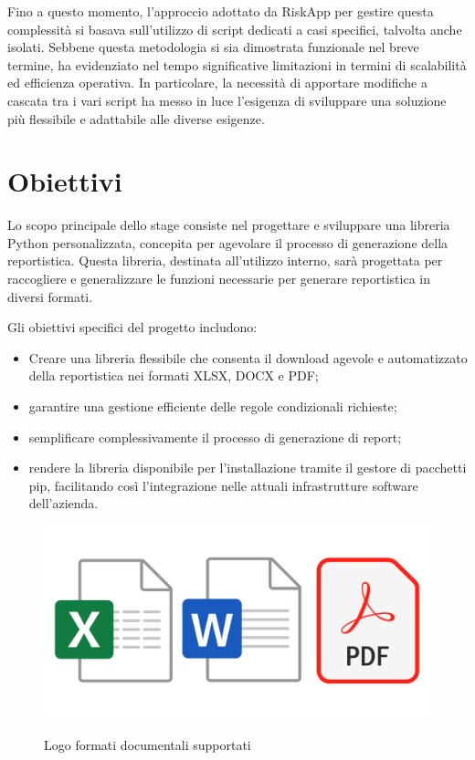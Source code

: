 Fino a questo momento, l'approccio adottato da RiskApp per gestire questa complessità si basava sull'utilizzo di script dedicati a casi specifici, talvolta anche isolati. Sebbene questa metodologia si sia dimostrata funzionale nel breve termine, ha evidenziato nel tempo significative limitazioni in termini di scalabilità ed efficienza operativa. In particolare, la necessità di apportare modifiche a cascata tra i vari script ha messo in luce l'esigenza di sviluppare una soluzione più flessibile e adattabile alle diverse esigenze.

\section{Obiettivi}
Lo scopo principale dello stage consiste nel progettare e sviluppare una libreria Python personalizzata, concepita per agevolare il processo di generazione della reportistica. Questa libreria, destinata all'utilizzo interno, sarà progettata per raccogliere e generalizzare le funzioni necessarie per generare reportistica in diversi formati.

Gli obiettivi specifici del progetto includono:

\begin{itemize}
	\item Creare una libreria flessibile che consenta il download agevole e automatizzato della reportistica nei formati XLSX, DOCX e PDF;
	\item garantire una gestione efficiente delle regole condizionali richieste;
	\item semplificare complessivamente il processo di generazione di report;
	\item rendere la libreria disponibile per l'installazione tramite il gestore di pacchetti \gls{pip}, facilitando così l'integrazione nelle attuali infrastrutture software dell'azienda.
\end{itemize}

\begin{figure}[H]
	\centering
	\includegraphics[alt={Logo docx, xlsx e pdf}, width=1\columnwidth]{img/format_logos.jpg}
	\caption{Logo formati documentali supportati}
	\label{fig:logos}
\end{figure}

